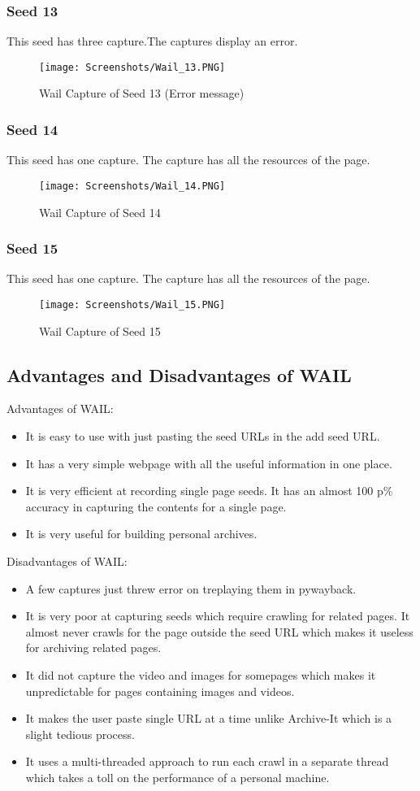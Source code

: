 \documentclass[11pt,journal,compsoc,onecolumn]{IEEEtran}
\begin{document}
\subsubsection{Seed 13}
This seed has three capture.The captures display an error.
 \begin{figure}[ht] 
  \centering
  \texttt{[image: Screenshots/Wail\_13.PNG]}
  \caption{Wail Capture of Seed 13 (Error message)}
  \label{fig:52}
\end{figure}
\subsubsection{Seed 14}
This seed has one capture. The capture has all the resources of the page.
 \begin{figure}[ht] 
  \centering
  \texttt{[image: Screenshots/Wail\_14.PNG]}
  \caption{Wail Capture of Seed 14}
  \label{fig:53}
\end{figure}
\subsubsection{Seed 15}
This seed has one capture. The capture has all the resources of the page.
 \begin{figure}[ht] 
  \centering
  \texttt{[image: Screenshots/Wail\_15.PNG]}
  \caption{Wail Capture of Seed 15}
  \label{fig:54}
\end{figure}
\subsection{Advantages and Disadvantages of WAIL}
Advantages of WAIL:
\begin{itemize}
\item It is easy to use with just pasting the seed URLs in the add seed URL.
\item It has a very simple webpage with all the useful information in one place.
\item It is very efficient at recording single page seeds. It has an almost 100 p\% accuracy in capturing the contents for a single page.
\item It is very useful for building personal archives.
\end{itemize}
Disadvantages of WAIL:
\begin{itemize}
\item A few captures just threw error on treplaying them in pywayback.
\item It is very poor at capturing seeds which require crawling for related pages. It almost never crawls for the page outside the seed URL which makes it useless for archiving related pages.
\item It did not capture the video and images for somepages which makes it unpredictable for pages containing images and videos.
\item It makes the user paste single URL at a time unlike Archive-It which is a slight tedious process.
\item It uses a multi-threaded approach to run each crawl in a separate thread which takes a toll on the performance of a personal machine.
\end{itemize}
\end{document}
